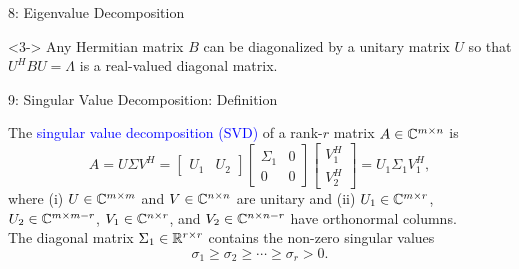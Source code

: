 \documentclass[10pt,english,aspectratio=169]{beamer}
\begin{document}
\begin{frame}{8: Eigenvalue Decomposition}
\begin{theorem}<3->
Any Hermitian matrix $B$ can be diagonalized by a unitary matrix $U$ so that $U^H B U = \Lambda$ is a real-valued diagonal matrix.
\end{theorem}

\vspace{-1mm}



\end{frame}


\begin{frame}{9: Singular Value Decomposition: Definition}

\begin{definition}
The \textcolor{blue}{singular value decomposition (SVD)} of a rank-$r$ matrix $A \in \mathbb{C}^{m \times n}$ is \vspace{-1mm}
\begin{equation*}
A = U \Sigma V^H
= \left[ \begin{array}{cc} U_1 & U_2 \end{array} \right]
\left[ \begin{array}{cc} \Sigma_1 & 0 \\ 0 & 0 \end{array} \right]
\left[ \begin{array}{c} V_1^H \\ V_2^H \end{array} \right]
= U_1 \Sigma_1 V_1^H,
\end{equation*}
where (i) $U \in \mathbb{C}^{m \times m}$ and $V \in \mathbb{C}^{n \times n}$ are unitary and (ii) $U_1 \in \mathbb{C}^{m \times r}$, $U_2 \in \mathbb{C}^{m \times m-r}$, $V_1 \in \mathbb{C}^{n \times r}$, and $V_2 \in \mathbb{C}^{n \times n-r}$ have orthonormal columns.
\\ The diagonal matrix $\Sigma_1 \in \mathbb{R}^{r \times r}$ contains the non-zero singular values \vspace{-2mm}
\[ \sigma_1 \geq \sigma_2 \geq \cdots \geq \sigma_r > 0. \]
\end{definition}

\vspace{1mm}


\end{frame}
\end{document}
